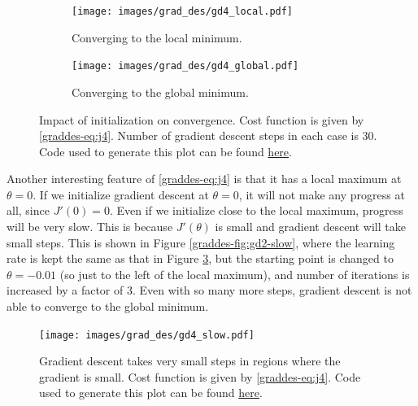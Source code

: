 \documentclass{article}
\theoremstyle{definition}
\begin{document}
\begin{figure}[ht]
    \begin{subfigure}[ht]{\linewidth}
        \centering
        \texttt{[image: images/grad\_des/gd4\_local.pdf]}
        \caption{Converging to the local minimum.}
        \label{graddes-fig:gd4-local}
    \end{subfigure}%
    
    \begin{subfigure}[ht]{\linewidth}
        \centering
        \texttt{[image: images/grad\_des/gd4\_global.pdf]}
        \caption{Converging to the global minimum.}
        \label{graddes-fig:gd4-global}
    \end{subfigure}%
    
    \caption{Impact of initialization on convergence. Cost function is given by \eqref{graddes-eq:j4}. Number of gradient descent steps in each case is 30. Code used to generate this plot can be found \href{https://github.com/siavashaslanbeigi/ml_notes/blob/master/src/grad_des/basics.ipynb}{\color{blue} here}.}
    \label{graddes-fig:gd4-init}
\end{figure}

Another interesting feature of \eqref{graddes-eq:j4} is that it has a local maximum at $\theta=0$. If we initialize gradient descent at $\theta=0$, it will not make any progress at all, since $J'(0)=0$. Even if we initialize close to the local maximum, progress will be very slow. This is because $J'(\theta)$ is small and gradient descent will take small steps. This is shown in Figure \ref{graddes-fig:gd2-slow}, where the learning rate is kept the same as that in Figure \ref{graddes-fig:gd4-init}, but the starting point is changed to $\theta=-0.01$ (so just to the left of the local maximum), and number of iterations is increased by a factor of 3. Even with so many more steps, gradient descent is not able to converge to the global minimum.

\begin{figure}[ht]
\centering
\texttt{[image: images/grad\_des/gd4\_slow.pdf]}
\caption{Gradient descent takes very small steps in regions where the gradient is small. Cost function is given by \eqref{graddes-eq:j4}. Code used to generate this plot can be found \href{https://github.com/siavashaslanbeigi/ml_notes/blob/master/src/grad_des/basics.ipynb}{\color{blue} here}.}
\label{graddes-fig:gd4-slow}
\end{figure}


\clearpage
\appendix
\end{document}
